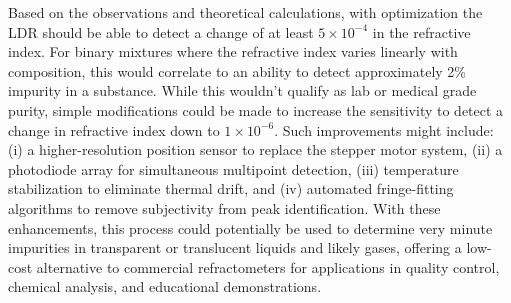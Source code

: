 Based on the observations and theoretical calculations, with
optimization the LDR should be able to detect a change of at least
$5 \times 10^{-4}$ in the refractive index.
For binary mixtures where the refractive index varies linearly with
composition, this would correlate to an ability to detect approximately
2\% impurity in a substance.
While this wouldn't qualify as lab or medical grade purity, simple
modifications could be made to increase the sensitivity to detect a
change in refractive index down to $1 \times 10^{-6}$.
Such improvements might include: (i) a higher-resolution position
sensor to replace the stepper motor system, (ii) a photodiode array for
simultaneous multipoint detection, (iii) temperature stabilization to
eliminate thermal drift, and (iv) automated fringe-fitting algorithms
to remove subjectivity from peak identification.
With these enhancements, this process could potentially be used to
determine very minute impurities in transparent or translucent liquids
and likely gases, offering a low-cost alternative to commercial
refractometers for applications in quality control, chemical analysis,
and educational demonstrations.

